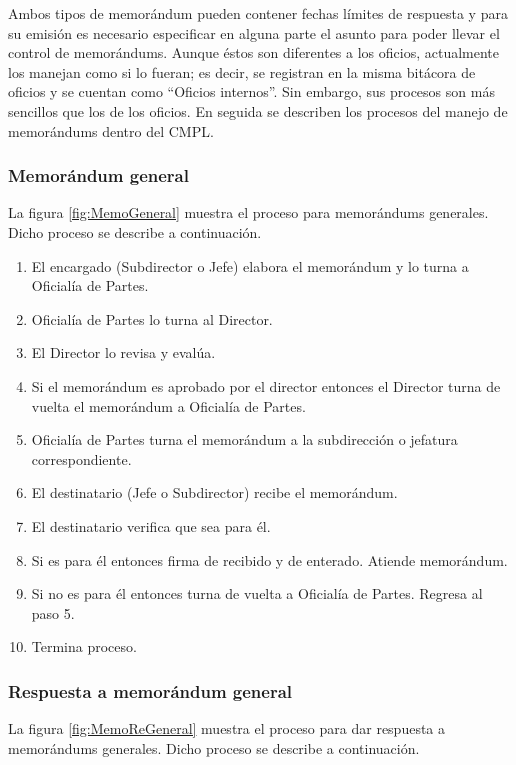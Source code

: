 	Ambos tipos de memorándum pueden contener fechas límites de respuesta y para su emisión es necesario especificar en alguna parte el asunto para poder llevar el control de memorándums. Aunque éstos son diferentes a los oficios, actualmente los manejan como si lo fueran; es decir, se registran en la misma bitácora de oficios y se cuentan como ``Oficios internos''. Sin embargo, sus procesos son más sencillos que los de los oficios. En seguida se describen los procesos del manejo de memorándums dentro del CMPL. 

	\subsubsection{Memorándum general}
	La figura \ref{fig:MemoGeneral} muestra el proceso para memorándums generales. Dicho proceso se describe a continuación.
	
	\begin{enumerate}
		\item El encargado (Subdirector o Jefe) elabora el memorándum y lo turna a Oficialía de Partes.
		\item Oficialía de Partes lo turna al Director.
		\item El Director lo revisa y evalúa.
		\item Si el memorándum es aprobado por el director entonces el Director turna de vuelta el memorándum a Oficialía de Partes.
		\item Oficialía de Partes turna el memorándum a la subdirección o jefatura correspondiente.
		\item El destinatario (Jefe o Subdirector) recibe el memorándum.
		\item El destinatario verifica que sea para él.
		\item Si es para él entonces firma de recibido y de enterado. Atiende memorándum.
		\item Si no es para él entonces turna de vuelta a Oficialía de Partes. Regresa al paso 5.
		\item Termina proceso.
	\end{enumerate}
	
	
	\subsubsection{Respuesta a memorándum general}
	La figura \ref{fig:MemoReGeneral} muestra el proceso para dar respuesta a memorándums generales. Dicho proceso se describe a continuación.
	
